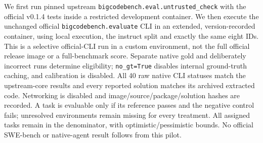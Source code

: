 We first run pinned upstream \texttt{bigcodebench.eval.untrusted\_check} with the official v0.1.4 tests inside a restricted development container. We then execute the unchanged official \texttt{bigcodebench.evaluate} CLI in an extended, version-recorded container, using local execution, the instruct split and exactly the same eight IDs. This is a selective official-CLI run in a custom environment, not the full official release image or a full-benchmark score. Separate native gold and deliberately incorrect runs determine eligibility; \texttt{no\_gt=True} disables internal ground-truth caching, and calibration is disabled. All 40 raw native CLI statuses match the upstream-core results and every reported solution matches its archived extracted code. Networking is disabled and image/source/package/solution hashes are recorded. A task is evaluable only if its reference passes and the negative control fails; unresolved environments remain missing for every treatment. All assigned tasks remain in the denominator, with optimistic/pessimistic bounds. No official SWE-bench or native-agent result follows from this pilot.


